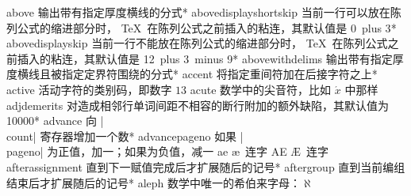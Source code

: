 \capcs above {输出带有指定厚度横线的分式}*{}
\capcs abovedisplayshortskip {当前一行可以放在陈列公式的缩进部分时，
\TeX\ 在陈列公式之前插入的粘连，其默认值是 0\pt\ plus 3\pt}*{}
\capcs abovedisplayskip {当前一行不能放在陈列公式的缩进部分时，
\TeX\ 在陈列公式之前插入的粘连，其默认值是 12\pt\ plus 3\pt\ minus 9\pt}*{}
\capcs abovewithdelims {输出带有指定厚度横线且被指定定界符围绕的分式}*{}
\capcs accent {将指定重间符加在后接字符之上}*{}
\capcs active {活动字符的类别码，即数字 $13$}{}{}
\capcs acute {数学中的尖音符，比如 $\acute x$ 中那样}{}{}
\capcs adjdemerits {对造成相邻行单词间距不相容的断行附加的额外缺陷，其默认值为 10000}*{}
\capcs advance {向 |\\count| 寄存器增加一个数}*{}
\capcs advancepageno {如果 |\\pageno| 为正值，加一；如果为负值，减一}{}{}
\capcs ae {\ae\ 连字}{}{}
\capcs AE {\AE\ 连字}{}{}
\capcs afterassignment {直到下一赋值完成后才扩展随后的记号}*{}
\capcs aftergroup {直到当前编组结束后才扩展随后的记号}*{}
\capcs aleph {数学中唯一的希伯来字母：$\aleph$}{}{}
